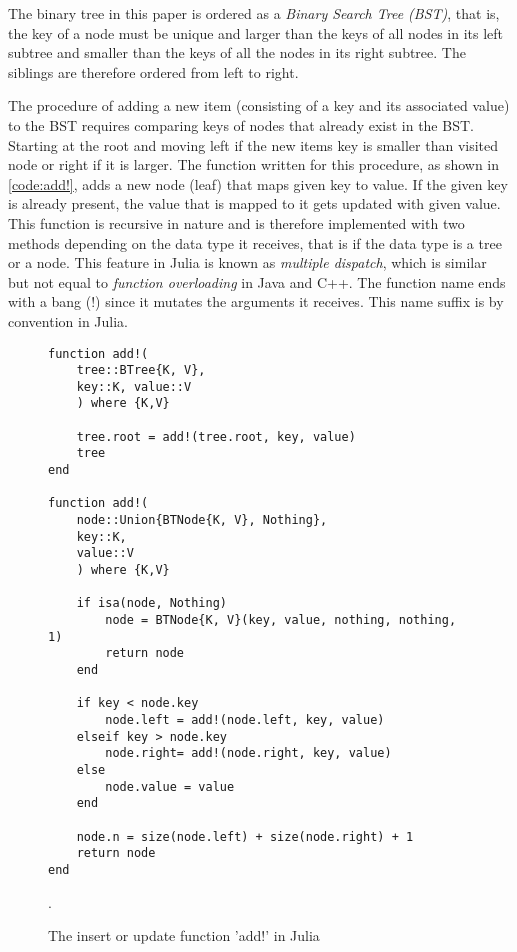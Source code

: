 \documentclass[a4paper, 11pt]{article}
\begin{document}
    The binary tree in this paper is ordered as a \emph{Binary Search Tree (BST)}, that is, 
    the key of a node must be unique and larger than the keys of all nodes in
    its left subtree and smaller than the keys of all the nodes in its right
    subtree. The siblings are therefore ordered from left to right.

    The procedure of adding a new item (consisting of a key and its associated value)
    to the BST requires comparing keys of
    nodes that already exist in the BST. Starting at the root and moving left
    if the new items key is smaller than visited node or right if it is larger. 
    The function written for this procedure, as shown in 
    \autoref{code:add!}, adds a new node (leaf) that maps
    given key to value. If the given key is already present, the value that is
    mapped to it gets updated with given value. This function is recursive in nature and 
    is therefore implemented with two methods depending on 
    the data type it receives,  that is if the data type is a tree or a node. 
    This feature in Julia is known as
    \emph{multiple dispatch}, which is similar but not equal to \emph{function
    overloading} in Java and C++. The function name ends with a bang (!) since it
    mutates the arguments it receives. This name suffix is by convention in Julia.

    \begin{figure}[H]
        \centering
    \begin{verbatim}
function add!(
    tree::BTree{K, V}, 
    key::K, value::V
    ) where {K,V}
    
    tree.root = add!(tree.root, key, value)
    tree
end

function add!(
    node::Union{BTNode{K, V}, Nothing}, 
    key::K, 
    value::V
    ) where {K,V}

    if isa(node, Nothing)  
        node = BTNode{K, V}(key, value, nothing, nothing, 1)
        return node
    end

    if key < node.key
        node.left = add!(node.left, key, value)
    elseif key > node.key
        node.right= add!(node.right, key, value)
    else
        node.value = value
    end

    node.n = size(node.left) + size(node.right) + 1
    return node
end
    \end{verbatim}
    \caption{The insert or update function 'add!' in Julia}.
    \label{code:add!}
    \end{figure}
\end{document}
